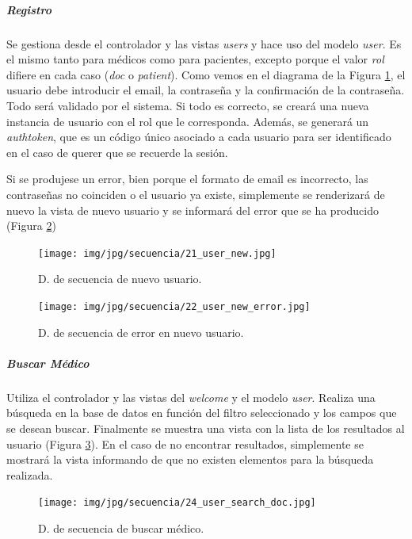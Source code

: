 \documentclass[a4paper,oneside,11pt]{book}
\begin{document}
			
				\subparagraph{Registro} %
				\label{subp:cont_registro}
				
					Se gestiona desde el controlador y las vistas \textit{users} y hace uso del modelo \textit{user}. Es el mismo tanto para médicos como para pacientes, excepto porque el valor \textit{rol} difiere en cada caso (\textit{doc} o \textit{patient}). Como vemos en el diagrama de la Figura \ref{fig:cont_user_new}, el usuario debe introducir el email, la contraseña y la confirmación de la contraseña. Todo será validado por el sistema. Si todo es correcto, se creará una nueva instancia de usuario con el rol que le corresponda. Además, se generará un \textit{authtoken}, que es un código único asociado a cada usuario para ser identificado en el caso de querer que se recuerde la sesión.
					
					Si se produjese un error, bien porque el formato de email es incorrecto, las contraseñas no coinciden o el usuario ya existe, simplemente se renderizará de nuevo la vista de nuevo usuario y se informará del error que se ha producido (Figura \ref{fig:cont_user_new_error})
					
					\begin{figure}[H]
					  \centering
					    \texttt{[image: img/jpg/secuencia/21\_user\_new.jpg]}
					  \caption{D. de secuencia de nuevo usuario.}
					  \label{fig:cont_user_new}
					\end{figure}

					\begin{figure}[H]
					  \centering
					    \texttt{[image: img/jpg/secuencia/22\_user\_new\_error.jpg]}
					  \caption{D. de secuencia de error en nuevo usuario.}
					  \label{fig:cont_user_new_error}
					\end{figure}
				\newpage
				\subparagraph{Buscar Médico} %
				\label{subp:cont_buscar_medico}
					
					Utiliza el controlador y las vistas del \textit{welcome} y el modelo \textit{user}. Realiza una búsqueda en la base de datos en función del filtro seleccionado y los campos que se desean buscar. Finalmente se muestra una vista con la lista de los resultados al usuario (Figura \ref{fig:cont_user_search_doc}). En el caso de no encontrar resultados, simplemente se mostrará la vista informando de que no existen elementos para la búsqueda realizada.
					
					\begin{figure}[H]
					  \centering
					    \texttt{[image: img/jpg/secuencia/24\_user\_search\_doc.jpg]}
					  \caption{D. de secuencia de buscar médico.}
					  \label{fig:cont_user_search_doc}
					\end{figure}
					
\end{document}
